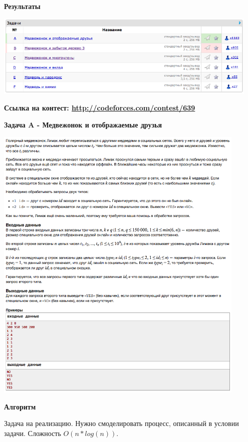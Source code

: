 \documentclass[a4paper,12pt]{article}
\begin{document}
\textbf{{\large Результаты}} \\
\begin{center}
\includegraphics[width=0.95\textwidth]{VK_R1/result.png}\\ [1cm]
\end{center}

\textbf{{\large Ссылка на контест: \url{http://codeforces.com/contest/639}}}

\newpage
\textbf{{\large Задача A - Медвежонок и отображаемые друзья}}

\begin{center}
\includegraphics[width=0.9\textwidth]{VK_R1/A.png}\\ [1cm]
\end{center}

\textbf{{\large Алгоритм}}

Задача на реализацию. Нужно смоделировать процесс, описанный в условии задачи. Сложность $O(n * log(n))$.\\
\end{document}
